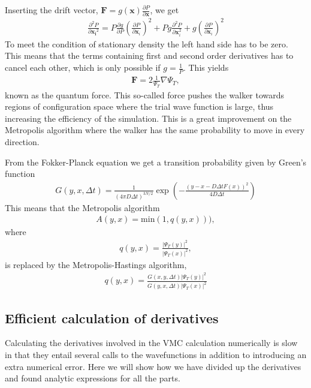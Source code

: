 \documentclass[x11names]{article}
\begin{document}
		Inserting the drift vector, $\mathbf{F}=g(\mathbf{x})\frac{\partial P}{\partial\mathbf{x}}$,
		we get
		\begin{align}
			\frac{\partial^{2}P}{\partial{\mathbf{x_{i}}^{2}}}=P\frac{\partial g}{\partial P}\left(\frac{\partial P}{\partial{\mathbf{x}_{i}}}\right)^{2}+Pg\frac{\partial^{2}P}{\partial{\mathbf{x}_{i}^{2}}}+g\left(\frac{\partial P}{\partial{\mathbf{x}_{i}}}\right)^{2}
		\end{align}
		To meet the condition of stationary density the left hand side has
		to be zero. This means that the terms containing first and second
		order derivatives has to cancel each other, which is only possible
		if $g=\frac{1}{P}$. This yields
		\begin{align}
			\mathbf{F}=2\frac{1}{\Psi_{T}}\nabla\Psi_{T},
		\end{align}
		known as the quantum force. This so-called force pushes the walker
		towards regions of configuration space where the trial wave function
		is large, thus increasing the efficiency of the simulation. This is
		a great improvement on the Metropolis algorithm where the walker has
		the same probability to move in every direction.

		From the Fokker-Planck equation we get a transition probability given
		by Green's function
		\begin{align}
			G(y,x,\Delta t)=\frac{1}{(4\pi D\Delta t)^{3N/2}}\exp\left(-\frac{(y-x-D\Delta tF(x))^{2}}{4D\Delta t}\right)
		\end{align}
		This means that the Metropolis algorithm
		\begin{align}
			A(y,x)=\mathrm{min}(1,q(y,x))),
		\end{align}
		where
		\begin{align}
			q(y,x)=\frac{|\Psi_{T}(y)|^{2}}{|\Psi_{T}(x)|^{2}},
		\end{align}
		is replaced by the Metropolis-Hastings algorithm,
		\begin{align}
			q(y,x)=\frac{G(x,y,\Delta t)|\Psi_{T}(y)|^{2}}{G(y,x,\Delta t)|\Psi_{T}(x)|^{2}}
		\end{align}

		\subsection{Efficient calculation of derivatives}
		Calculating the derivatives involved in the VMC calculation numerically is slow in that they entail several calls to the wavefunctions in addition to introducing an extra numerical error. Here we will show how we have divided up the derivatives and found analytic expressions for all the parts.
\end{document}
